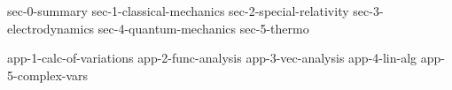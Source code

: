 \documentclass[11pt, letterpaper]{report}
\begin{document}
\begin{titlepage}
\maketitle
\setcounter{tocdepth}{1}
\tableofcontents
\end{titlepage}


{sec-0-summary}
{sec-1-classical-mechanics}
{sec-2-special-relativity}
{sec-3-electrodynamics}
{sec-4-quantum-mechanics}
{sec-5-thermo}


\begin{appendices}
{app-1-calc-of-variations}
{app-2-func-analysis}
{app-3-vec-analysis}
{app-4-lin-alg}
{app-5-complex-vars}
\end{appendices}


\newpage




\newpage
\printindex


\end{document}
